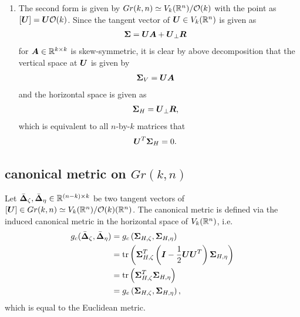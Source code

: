 \documentclass[11pt]{article}
\begin{document}
\begin{enumerate}
\item The second form is given by  $Gr(k,n) \simeq V_{k}({\mathbb R}^{n})/{\mathcal O}(k)$ with the point as $[\boldsymbol{U}] = \boldsymbol{U}{\mathcal O}(k)$.
Since the tangent vector of $\boldsymbol{U}\in  V_{k}({\mathbb R}^{n})$ is given as 
\begin{align*}
\boldsymbol{\Sigma} &= \boldsymbol{U}\boldsymbol{A} + \boldsymbol{U}_{\bot}\boldsymbol{R}
\end{align*} for $\boldsymbol{A}\in {\mathbb R}^{k\times k}$ is skew-symmetric, it is clear by above decomposition that the vertical space at $\boldsymbol{U}$ is given by 
\begin{align*}
\boldsymbol{\Sigma}_{V} &= \boldsymbol{U}\boldsymbol{A} 
\end{align*} and the horizontal space is given as 
\begin{align*}
\boldsymbol{\Sigma}_{H} &= \boldsymbol{U}_{\bot}\boldsymbol{R}, 
\end{align*} which is equivalent to all $n$-by-$k$ matrices that 
\begin{align*}
\boldsymbol{U}^{T}\boldsymbol{\Sigma}_{H}  &= 0.
\end{align*}

\end{enumerate}
\subsection{canonical metric on $Gr(k, n)$}
Let $\bar{\boldsymbol{\Delta}}_{\zeta}, \bar{\boldsymbol{\Delta}}_{\eta} \in {\mathbb R}^{(n-k) \times k}$ be two tangent vectors of $[\boldsymbol{U}]\in Gr(k,n)\simeq  V_{k}({\mathbb R}^{n})/{\mathcal O}(k)({\mathbb R}^{n})$. The canonical metric is defined via the induced canonical metric in the horizontal space of $V_{k}({\mathbb R}^{n})$, i.e. 
\begin{align}
 g_{c}(\bar{\boldsymbol{\Delta}}_{\zeta}, \bar{\boldsymbol{\Delta}}_{\eta}) &=g_{c}\left( \boldsymbol{\Sigma}_{H,\zeta}, \boldsymbol{\Sigma}_{H,\eta} \right)\nonumber\\
&=\mathrm{tr}\left( \boldsymbol{\Sigma}_{H,\zeta}^{T}\left(\boldsymbol{I} -  \frac{1}{2}\boldsymbol{U}\boldsymbol{U}^{T} \right)  \boldsymbol{\Sigma}_{H,\eta} \right) \nonumber\\
&= \mathrm{tr}\left(  \boldsymbol{\Sigma}_{H,\zeta}^{T}\boldsymbol{\Sigma}_{H,\eta} \right)\nonumber\\
&= g_{e}\left( \boldsymbol{\Sigma}_{H,\zeta}, \boldsymbol{\Sigma}_{H,\eta} \right), \label{eqn: can_metric_Grass_mat}
\end{align}
which is equal to the Euclidean metric.
\end{document}
